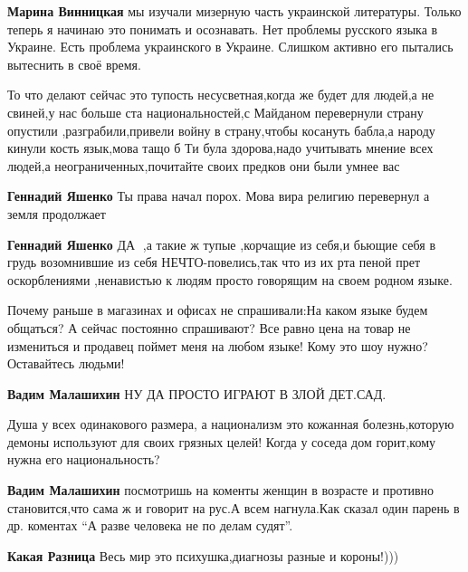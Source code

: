 \begin{itemize}
{\begin{itemize}
\textbf{Марина Винницкая} мы изучали мизерную часть украинской литературы. Только теперь я начинаю это понимать и осознавать.
Нет проблемы русского языка в Украине. Есть проблема украинского в Украине. Слишком активно его пытались вытеснить в своё время.
\end{itemize}


То что делают сейчас это тупость несусветная,когда же будет для людей,а не
свиней,у нас больше ста национальностей,с Майданом перевернули страну опустили
,разграбили,привели войну в страну,чтобы косануть бабла,а народу кинули кость
язык,мова тащо б Ти була здорова,надо учитывать мнение всех людей,а
неограниченных,почитайте своих предков они были умнее вас

\begin{itemize}

\textbf{Геннадий Яшенко} Ты права начал порох. Мова вира религию перевернул а земля продолжает

\textbf{Геннадий Яшенко} ДА 💯,а такие ж тупые ,корчащие из себя,и бьющие себя
в грудь возомнившие из себя НЕЧТО-повелись,так что из их рта пеной прет
оскорблениями ,ненавистью к людям просто говорящим на своем родном языке.
\end{itemize}


Почему раньше в магазинах и офисах не спрашивали:На каком языке будем общаться?
А сейчас постоянно спрашивают? Все равно цена на товар не измениться и продавец
поймет меня на любом языке! Кому это шоу нужно? Оставайтесь людьми!

\begin{itemize}
\textbf{Вадим Малашихин} НУ ДА ПРОСТО ИГРАЮТ В ЗЛОЙ ДЕТ.САД.

Душа у всех одинакового размера, а национализм это кожанная болезнь,которую демоны используют для своих грязных целей! Когда у соседа дом горит,кому нужна его национальность?

\textbf{Вадим Малашихин} посмотришь на коменты женщин в возрасте и противно
становится,что сама ж и говорит на рус.А всем нагнула.Как сказал один парень в
др. коментах \enquote{А разве человека не по делам судят}.

\textbf{Какая Разница} Весь мир это психушка,диагнозы разные и короны!)))
\end{itemize}

}
\end{itemize}
